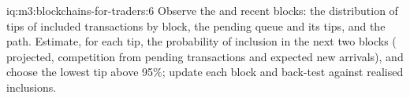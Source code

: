 \begin{solution}{iq:m3:blockchains-for-traders:6}
Observe the  and recent blocks: the distribution of tips of included transactions by block, the pending
queue and its tips, and the  path. Estimate, for each tip, the probability of inclusion in the next two
blocks ( projected, competition from pending transactions and expected new arrivals), and choose the lowest
tip above 95\%; update each block and back-test against realised inclusions.
\end{solution}
